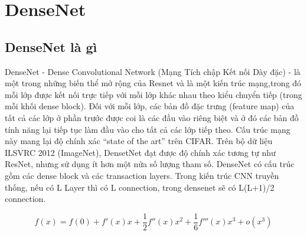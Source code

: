 \section{DenseNet}
\subsection{DenseNet là gì}
DenseNet - Dense Convolutional Network (Mạng Tích chập Kết nối Dày đặc) - là một trong những biến thể mở rộng của Resnet và là một kiến trúc mạng,trong đó mỗi lớp được kết nối trực tiếp với mỗi lớp khác nhau theo kiểu chuyển tiếp (trong mỗi khối dense block). Đối với mỗi lớp, các bản đồ đặc trưng (feature map) của tất cả các lớp ở phần trước được coi là các đầu vào riêng biệt và ở đó các bản đồ tính năng lại tiếp tục làm đầu vào cho tất cả các lớp tiếp theo. Cấu trúc mạng này mang lại độ chính xác “state of the art” trên CIFAR. Trên bộ dữ liệu ILSVRC 2012 (ImageNet), DensetNet đạt được độ chính xác tương tự như ResNet, nhưng sử dụng ít hơn một nửa số lượng tham số. DenseNet có cấu trúc gồm các dense block và các transaction layers. Trong kiến trúc CNN truyền thống, nếu có L Layer thì có L connection, trong densenet sẽ có L(L+1)/2 connection\cite{densenetlagi}.

$$f(x) = f(0) + f'(x) x + \frac{1}{2} f''(x) x^2 + \frac{1}{6} f'''(x) x^3 + o(x^3)$$